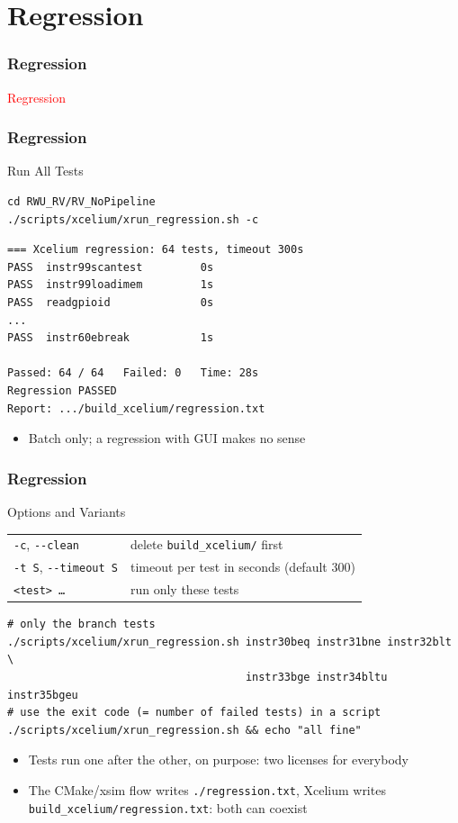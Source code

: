 \documentclass{beamer}
\newcommand{\astitle}{nix}
\newcommand{\assubtitle}{nix}
\newcommand{\cmd}[1]{\texttt{#1}}
\begin{document}
\section{Regression}
\renewcommand{\astitle}{Regression}
\begin{frame}
\frametitle{\astitle}
\textcolor{red}{Regression}
\end{frame}

\renewcommand{\assubtitle}{Run All Tests}
\begin{frame}[fragile]
\frametitle{\astitle}
\begin{block}{\assubtitle}
\begin{lstlisting}[style=sh,basicstyle=\ttfamily\small]
cd RWU_RV/RV_NoPipeline
./scripts/xcelium/xrun_regression.sh -c
\end{lstlisting}
\begin{lstlisting}
=== Xcelium regression: 64 tests, timeout 300s
PASS  instr99scantest         0s
PASS  instr99loadimem         1s
PASS  readgpioid              0s
...
PASS  instr60ebreak           1s

Passed: 64 / 64   Failed: 0   Time: 28s
Regression PASSED
Report: .../build_xcelium/regression.txt
\end{lstlisting}
  \begin{itemize}
    \item Batch only; a regression with GUI makes no sense
  \end{itemize}
\end{block}
\end{frame}

\renewcommand{\assubtitle}{Options and Variants}
\begin{frame}[fragile]
\frametitle{\astitle}
\begin{block}{\assubtitle}
  \footnotesize
  \begin{tabularx}{\linewidth}{@{}lY@{}}
    \cmd{-c}, \cmd{-{}-clean}        & delete \cmd{build\_xcelium/} first\\[2pt]
    \cmd{-t S}, \cmd{-{}-timeout S}  & timeout per test in seconds (default 300)\\[2pt]
    \cmd{<test> \dots}               & run only these tests\\
  \end{tabularx}
\begin{lstlisting}[style=sh]
# only the branch tests
./scripts/xcelium/xrun_regression.sh instr30beq instr31bne instr32blt \
                                     instr33bge instr34bltu instr35bgeu
# use the exit code (= number of failed tests) in a script
./scripts/xcelium/xrun_regression.sh && echo "all fine"
\end{lstlisting}
  \begin{itemize}
    \item Tests run one after the other, on purpose: two licenses for everybody
    \item The CMake/xsim flow writes \cmd{./regression.txt}, Xcelium writes
      \cmd{build\_xcelium/regression.txt}: both can coexist
  \end{itemize}
\end{block}
\end{frame}
\end{document}
